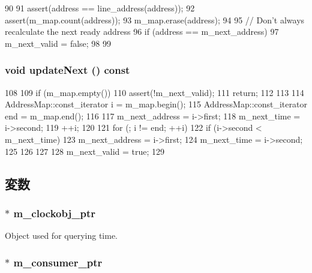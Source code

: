 \begin{DoxyCode}
90 {
91     assert(address == line_address(address));
92     assert(m_map.count(address));
93     m_map.erase(address);
94 
95     // Don't always recalculate the next ready address
96     if (address == m_next_address) {
97         m_next_valid = false;
98     }
99 }
\end{DoxyCode}
\hypertarget{classTimerTable_a05f4fd90d099c5d73fa5132cc4c998fc}{
\subsubsection[{updateNext}]{\setlength{\rightskip}{0pt plus 5cm}void updateNext () const}}
\label{classTimerTable_a05f4fd90d099c5d73fa5132cc4c998fc}



\begin{DoxyCode}
108 {
109     if (m_map.empty()) {
110         assert(!m_next_valid);
111         return;
112     }
113 
114     AddressMap::const_iterator i = m_map.begin();
115     AddressMap::const_iterator end = m_map.end();
116 
117     m_next_address = i->first;
118     m_next_time = i->second;
119     ++i;
120 
121     for (; i != end; ++i) {
122         if (i->second < m_next_time) {
123             m_next_address = i->first;
124             m_next_time = i->second;
125         }
126     }
127 
128     m_next_valid = true;
129 }
\end{DoxyCode}


\subsection{変数}
\hypertarget{classTimerTable_a7e1899f4b71f54a1b3d6813b09c78e48}{
\subsubsection[{m\_\-clockobj\_\-ptr}]{$\ast$ {\bf m\_\-clockobj\_\-ptr}}}
\label{classTimerTable_a7e1899f4b71f54a1b3d6813b09c78e48}


Object used for querying time. \hypertarget{classTimerTable_a83dd1dc8eef330b0c0d184a4167b26b4}{
\subsubsection[{m\_\-consumer\_\-ptr}]{$\ast$ {\bf m\_\-consumer\_\-ptr}}}
\label{classTimerTable_a83dd1dc8eef330b0c0d184a4167b26b4}


